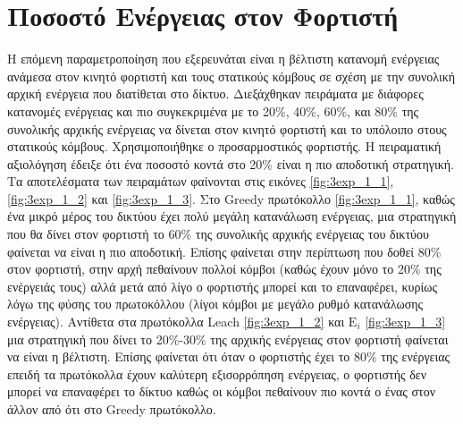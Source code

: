 \section{Ποσοστό Ενέργειας στον Φορτιστή}\label{sc:result3}
H επόμενη παραμετροποίηση που εξερευνάται είναι η βέλτιστη κατανομή ενέργειας ανάμεσα στον κινητό φορτιστή και τους στατικούς κόμβους σε σχέση με την συνολική αρχική
ενέργεια που διατίθεται στο δίκτυο. Διεξάχθηκαν πειράματα με διάφορες κατανομές ενέργειας και πιο συγκεκριμένα με το 20\%, 40\%, 60\%, και 80\% της συνολικής αρχικής
ενέργειας να δίνεται στον κινητό φορτιστή και το υπόλοιπο στους στατικούς κόμβους. Χρησιμοποιήθηκε ο προσαρμοστικός φορτιστής. Η πειραματική αξιολόγηση έδειξε ότι ένα
ποσοστό κοντά στο 20\% είναι η πιο αποδοτική στρατηγική. Τα αποτελέσματα των πειραμάτων φαίνονται στις εικόνες \ref{fig:3exp_1_1}, \ref{fig:3exp_1_2} και
\ref{fig:3exp_1_3}. Στο Greedy πρωτόκολλο \ref{fig:3exp_1_1}, καθώς ένα μικρό μέρος του δικτύου έχει πολύ μεγάλη κατανάλωση ενέργειας, μια στρατηγική που θα δίνει
στον φορτιστή το 60\% της συνολικής αρχικής ενέργειας του δικτύου φαίνεται να είναι η πιο αποδοτική. Επίσης φαίνεται στην περίπτωση που δοθεί 80\% στον φορτιστή, στην
αρχή πεθαίνουν πολλοί κόμβοι (καθώς έχουν μόνο το 20\% της ενέργειάς τους) αλλά μετά από λίγο ο φορτιστής μπορεί και το επαναφέρει, κυρίως λόγω της φύσης του
πρωτοκόλλου (λίγοι κόμβοι με μεγάλο ρυθμό κατανάλωσης ενέργειας). Αντίθετα στα πρωτόκολλα Leach \ref{fig:3exp_1_2} και $\text{E}_{i}$ \ref{fig:3exp_1_3} μια
στρατηγική που δίνει το 20\%-30\% της αρχικής ενέργειας στον φορτιστή φαίνεται να είναι η βέλτιστη. Επίσης φαίνεται ότι όταν ο φορτιστής έχει το 80\% της ενέργειας
επειδή τα πρωτόκολλα έχουν καλύτερη εξισορρόπηση ενέργειας, ο φορτιστής δεν μπορεί να επαναφέρει το δίκτυο καθώς οι κόμβοι πεθαίνουν πιο κοντά ο ένας στον άλλον από
ότι στο Greedy πρωτόκολλο.



